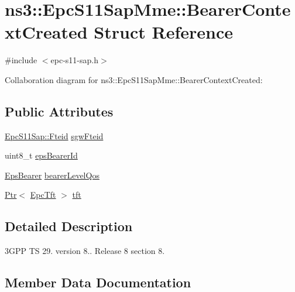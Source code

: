 \hypertarget{structns3_1_1EpcS11SapMme_1_1BearerContextCreated}{}\section{ns3\+:\+:Epc\+S11\+Sap\+Mme\+:\+:Bearer\+Context\+Created Struct Reference}
\label{structns3_1_1EpcS11SapMme_1_1BearerContextCreated}


{\ttfamily \#include $<$epc-\/s11-\/sap.\+h$>$}



Collaboration diagram for ns3\+:\+:Epc\+S11\+Sap\+Mme\+:\+:Bearer\+Context\+Created\+:
\subsection*{Public Attributes}
\begin{DoxyCompactItemize}
\item 
\hyperlink{structns3_1_1EpcS11Sap_1_1Fteid}{Epc\+S11\+Sap\+::\+Fteid} \hyperlink{structns3_1_1EpcS11SapMme_1_1BearerContextCreated_a0e20cfc35014ac53ab074e00ba00cb83}{sgw\+Fteid}
\item 
uint8\+\_\+t \hyperlink{structns3_1_1EpcS11SapMme_1_1BearerContextCreated_a8df63b8f49023da108c17d82a180f239}{eps\+Bearer\+Id}
\item 
\hyperlink{structns3_1_1EpsBearer}{Eps\+Bearer} \hyperlink{structns3_1_1EpcS11SapMme_1_1BearerContextCreated_ad7e1c32b27a8d21e15525d9efb493259}{bearer\+Level\+Qos}
\item 
\hyperlink{classns3_1_1Ptr}{Ptr}$<$ \hyperlink{classns3_1_1EpcTft}{Epc\+Tft} $>$ \hyperlink{structns3_1_1EpcS11SapMme_1_1BearerContextCreated_a3d0108bd9e2a5956e7d21ff71329ac26}{tft}
\end{DoxyCompactItemize}


\subsection{Detailed Description}
3\+G\+PP TS 29. version 8.. Release 8 section 8. 

\subsection{Member Data Documentation}
